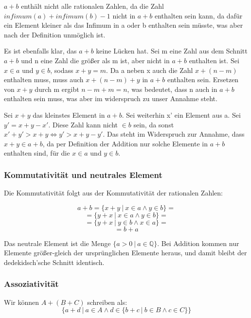 \documentclass[12pt]{article}
\begin{document}
    $a + b$ enthält nicht alle rationalen Zahlen, da die Zahl $infimum(a) + infimum(b) - 1$ nicht in $a + b$
    enthalten sein kann, da dafür ein Element kleiner als das Infimum in a oder b enthalten sein müsste, was
    aber nach der Definition unmöglich ist.

    Es ist ebenfalls klar, das $a + b$ keine Lücken hat.
    Sei m eine Zahl aus dem Schnitt $a + b$ und n eine Zahl die größer als m ist, aber nicht in $a + b$ enthalten ist.
    Sei $x \in a$ und $y \in b$, sodass $x + y = m$. Da a neben x auch die Zahl $x + (n - m)$ enthalten muss,
    muss auch $x + (n - m) + y$ in $a + b$ enthalten sein. Ersetzen von $x + y$ durch m ergibt $n - m + m = n$,
    was bedeutet, dass n auch in $a + b$ enthalten sein muss, was aber im widerspruch zu unser Annahme steht.

    Sei $x + y$ das kleinstes Element in $a + b$. Sei weiterhin x' ein Element aus a.
    Sei $y' = x + y - x'$. Diese Zahl kann nicht $\in b$ sein, da sonst $x' + y' > x + y \Leftrightarrow y' > x + y - y'$.
    Das steht im Widerspruch zur Annahme, dass $x + y \in a + b$, da per Definition der Addition nur solche Elemente
    in $a + b$ enthalten sind, für die $x \in a$ und $y \in b$.

    \subsubsection{Kommutativität und neutrales Element}

    Die Kommutativität folgt aus der Kommutativität der rationalen Zahlen:

    \[a + b = \{x + y \mspace{4mu} | \mspace{4mu} x \in a \land y \in b\} =\]
    \[= \{y + x \mspace{4mu} | \mspace{4mu} x \in a \land y \in b\} =\]
    \[= \{y + x \mspace{4mu} | \mspace{4mu} y \in b \land x \in a\} =\]
    \[= b + a\]

    Das neutrale Element ist die Menge $\{a > 0 \mspace{4mu} | \mspace{4mu} a \in \mathbb{Q}\}$.
    Bei Addition kommen nur Elemente größer-gleich der ursprünglichen Elemente heraus, und damit bleibt
    der dedekidsch'sche Schnitt identisch.

    \subsubsection{Assoziativität}

    Wir können $A + (B + C)$ schreiben als:
    \[\{a+d \mspace{4mu} | \mspace{4mu} a \in A \land d \in \{b + c \mspace{4mu} | \mspace{4mu} b \in B \land c \in C\}\}\]
\end{document}
